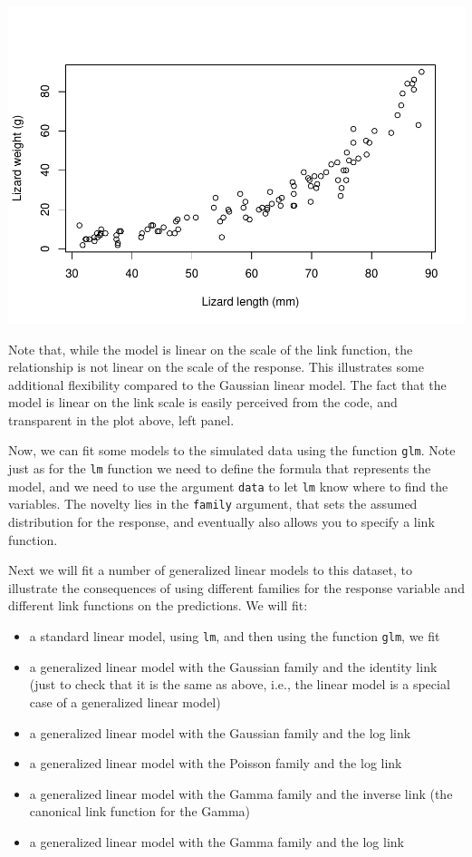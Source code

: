 \documentclass[
]{book}
\providecommand{\tightlist}{%
  \setlength{\itemsep}{0pt}\setlength{\parskip}{0pt}}
\begin{document}
\includegraphics{ECOMODbook_files/figure-latex/glm2-1.pdf}

Note that, while the model is linear on the scale of the link function, the relationship is not linear on the scale of the response. This illustrates some additional flexibility compared to the Gaussian linear model. The fact that the model is linear on the link scale is easily perceived from the code, and transparent in the plot above, left panel.

Now, we can fit some models to the simulated data using the function \texttt{glm}. Note just as for the \texttt{lm} function we need to define the formula that represents the model, and we need to use the argument \texttt{data} to let \texttt{lm} know where to find the variables. The novelty lies in the \texttt{family} argument, that sets the assumed distribution for the response, and eventually also allows you to specify a link function.

Next we will fit a number of generalized linear models to this dataset, to illustrate the consequences of using different families for the response variable and different link functions on the predictions. We will fit:

\begin{itemize}
\tightlist
\item
  a standard linear model, using \texttt{lm}, and then using the function \texttt{glm}, we fit
\item
  a generalized linear model with the Gaussian family and the identity link (just to check that it is the same as above, i.e., the linear model is a special case of a generalized linear model)
\item
  a generalized linear model with the Gaussian family and the log link
\item
  a generalized linear model with the Poisson family and the log link
\item
  a generalized linear model with the Gamma family and the inverse link (the canonical link function for the Gamma)
\item
  a generalized linear model with the Gamma family and the log link
\end{itemize}
\end{document}
